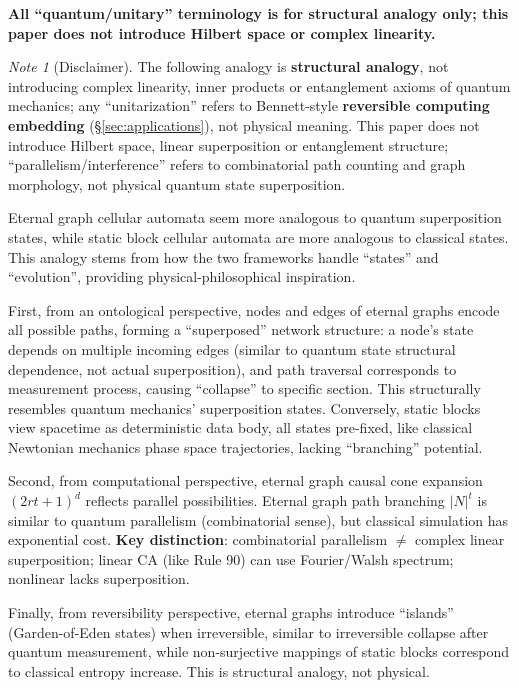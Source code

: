 \documentclass[11pt]{article}
\theoremstyle{definition}
\theoremstyle{remark}
\newtheorem*{note}{Note}
\begin{document}
\textbf{All ``quantum/unitary'' terminology is for structural analogy only; this paper does not introduce Hilbert space or complex linearity.}

\begin{note}[Disclaimer]
The following analogy is \textbf{structural analogy}, not introducing complex linearity, inner products or entanglement axioms of quantum mechanics; any ``unitarization'' refers to Bennett-style \textbf{reversible computing embedding} (§\ref{sec:applications}), not physical meaning. This paper does not introduce Hilbert space, linear superposition or entanglement structure; ``parallelism/interference'' refers to combinatorial path counting and graph morphology, not physical quantum state superposition.
\end{note}

Eternal graph cellular automata seem more analogous to quantum superposition states, while static block cellular automata are more analogous to classical states. This analogy stems from how the two frameworks handle ``states'' and ``evolution'', providing physical-philosophical inspiration.

First, from an ontological perspective, nodes and edges of eternal graphs encode all possible paths, forming a ``superposed'' network structure: a node's state depends on multiple incoming edges (similar to quantum state structural dependence, not actual superposition), and path traversal corresponds to measurement process, causing ``collapse'' to specific section. This structurally resembles quantum mechanics' superposition states. Conversely, static blocks view spacetime as deterministic data body, all states pre-fixed, like classical Newtonian mechanics phase space trajectories, lacking ``branching'' potential.

Second, from computational perspective, eternal graph causal cone expansion \( (2 r t + 1)^d \) reflects parallel possibilities. Eternal graph path branching \( |N|^t \) is similar to quantum parallelism (combinatorial sense), but classical simulation has exponential cost. \textbf{Key distinction}: combinatorial parallelism \( \neq \) complex linear superposition; linear CA (like Rule 90) can use Fourier/Walsh spectrum; nonlinear lacks superposition.

Finally, from reversibility perspective, eternal graphs introduce ``islands'' (Garden-of-Eden states) when irreversible, similar to irreversible collapse after quantum measurement, while non-surjective mappings of static blocks correspond to classical entropy increase. This is structural analogy, not physical.
\end{document}
